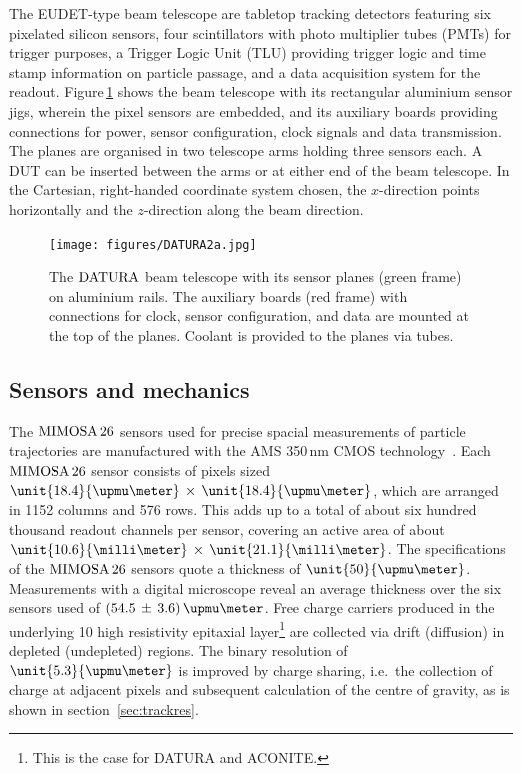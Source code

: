 
The EUDET-type beam telescope are tabletop tracking detectors featuring six pixelated silicon sensors, four scintillators with photo multiplier tubes (PMTs) for trigger purposes,
 a Trigger Logic Unit (TLU) providing trigger logic and time stamp information on particle passage, and a data acquisition system for the readout. 
Figure\,\ref{fig:datura-tscope} shows the beam telescope with its rectangular aluminium sensor jigs, wherein the pixel sensors are embedded,
 and its auxiliary boards providing connections for power, sensor configuration, clock signals and data transmission. 
The planes are organised in two telescope arms holding three sensors each. 
A DUT can be inserted between the arms or at either end of the beam telescope. 
In the Cartesian, right-handed coordinate system chosen, the $x$-direction points horizontally and the $z$-direction along the beam direction.

\begin{figure}[tb]
	\center
	\texttt{[image: figures/DATURA2a.jpg]}
	\caption[The $\Datura$ telescope]{The $\Datura$ beam telescope with its sensor planes (green frame) on aluminium rails.
	The auxiliary boards (red frame) with connections for clock, sensor configuration, and data are mounted at the top of the planes.
	Coolant is provided to the planes via tubes.}
	\label{fig:datura-tscope}
\end{figure}
 
\subsection{Sensors and mechanics}
\label{sec:sensors}

The $\textrm{MIMOSA\,26}$ sensors used for precise spacial measurements of particle trajectories are manufactured with the AMS 350\,nm CMOS technology~\cite{HuGuo2010480}. 
Each $\textrm{MIMOSA\,26}$ sensor consists of pixels sized $\unit{18.4}{\upmu\meter}\,\times\,\unit{18.4}{\upmu\meter}$, which are arranged in 1152 columns and 576 rows.
This adds up to a total of about six hundred thousand readout channels per sensor, covering an active area of about $\unit{10.6}{\milli\meter}\,\times\,\unit{21.1}{\milli\meter}$. 
The specifications of the $\textrm{MIMOSA\,26}$ sensors quote a thickness of $\unit{50}{\upmu\meter}$. 
Measurements with a digital microscope reveal an average thickness over the six sensors used of $(54.5\,\pm\,3.6)\,\upmu\meter$. 
Free charge carriers produced in the underlying \unit{10}{\upmu\meter} high resistivity epitaxial layer\footnote{This is the case for DATURA and ACONITE.} %
 are collected via drift (diffusion) in depleted (undepleted) regions. 
The binary resolution of $\unit{5.3}{\upmu\meter}$ is improved by charge sharing, i.e.\ the collection of charge at adjacent pixels and subsequent calculation of the centre of gravity,
 as is shown in section~\ref{sec:trackres}.

